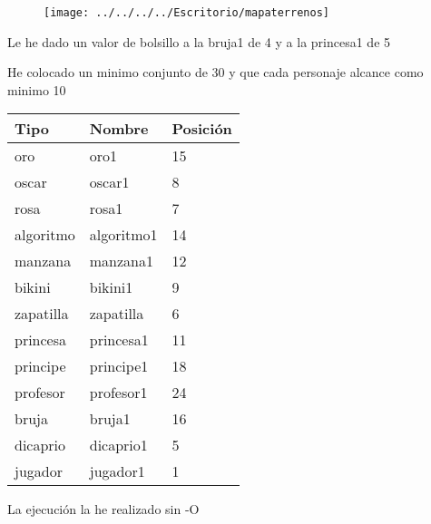 \documentclass[]{article}
\begin{document}
\begin{figure}[H]
	\centering
	\texttt{[image: ../../../../Escritorio/mapaterrenos]}
\end{figure}

Le he dado un valor de bolsillo a la bruja1 de 4 y a la princesa1 de 5

He colocado un minimo conjunto de 30 y que cada personaje alcance como minimo 10

\begin{table}[H]
	\begin{center}
		\begin{tabular}{|l|l|l|}
			\hline
			Tipo & Nombre & Posición \\
			\hline \hline
			oro & oro1 & 15 \\ \hline
			oscar & oscar1 & 8\\ \hline
			rosa & rosa1 & 7\\ \hline
			algoritmo & algoritmo1 & 14 \\ \hline
			manzana & manzana1 & 12\\ \hline
			bikini & bikini1 & 9\\ \hline
			zapatilla & zapatilla & 6\\ \hline 
			princesa & princesa1 & 11 \\ \hline
			principe & principe1 & 18 \\ \hline
			profesor & profesor1 & 24  \\ \hline
			bruja & bruja1 & 16 \\ \hline
			dicaprio  & dicaprio1& 5 \\ \hline
			jugador & jugador1 & 1 \\ \hline
			
		\end{tabular}
	\end{center}
\end{table}

La ejecución la he realizado sin -O
	
\end{document}
